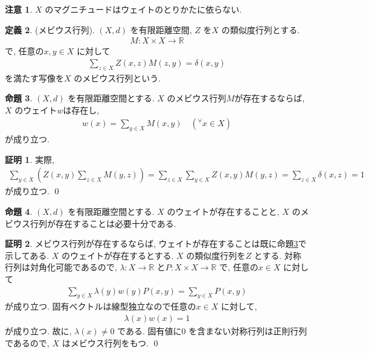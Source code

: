 \documentclass[10pt, fleqn, label-section=none]{bxjsarticle}
\theoremstyle{definition}
\newtheorem{dfn}{定義}[section]
\newtheorem{prop}[dfn]{命題}
\newtheorem*{pf*}{証明}
\newtheorem{remark}[dfn]{注意}
\newcommand{\any}{{}^{\forall}}
\renewcommand{\;}{\, ; \,}
\begin{document}
\begin{remark}$X$ のマグニチュードはウェイトのとりかたに依らない. 

\end{remark}



\begin{dfn}(メビウス行列). $(X, d)$ を有限距離空間, $Z$ を$X$ の類似度行列とする. 
\begin{align*} M: X \times X \rightarrow \mathbb R\end{align*} 
で, 任意の$x,y \in X$ に対して
\begin{align*} \sum_{z \in X} Z(x, z) M(z, y) = \delta (x,y) \end{align*}
を満たす写像を$X$ のメビウス行列という. 
\end{dfn}

\begin{prop}\label{1703}$(X, d)$ を有限距離空間とする. $X$ のメビウス行列$M$が存在するならば, $X$ のウェイト$w$は存在し, 
\begin{align*} w(x) = \sum_{y \in X} M(x, y) \quad (\any x \in X)\end{align*}
が成り立つ. 
\end{prop}
\begin{pf*}
実際, 
\begin{align*} \sum_{y \in X} (Z(x,y) \sum_{z \in X} M(y, z) )= \sum_{z \in X} \sum_{y \in X} Z(x, y)M(y, z) = \sum_{z \in X} \delta(x, z) = 1   \end{align*}
が成り立つ. 
\qed
\end{pf*}

\begin{prop}$(X, d)$ を有限距離空間とする. $X$ のウェイトが存在することと, $X$ のメビウス行列が存在することは必要十分である. 
\end{prop}
\begin{pf*}メビウス行列が存在するならば, ウェイトが存在することは既に命題\ref{1703}で示してある. $X$ のウェイトが存在するとする. $X$ の類似度行列を$Z$ とする. 対称行列は対角化可能であるので, 
$\lambda : X \rightarrow \mathbb R$ と$ P: X \times X \rightarrow \mathbb R$
で, 任意の$x \in X$ に対して
\begin{align*} \sum_{y \in X} \lambda (y) w(y) P(x, y) = \sum_{y \in X} P(x, y) \end{align*}
が成り立つ. 固有ベクトルは線型独立なので任意の$x \in X$ に対して, 
\begin{align*} \lambda(x) w(x) = 1\end{align*}
が成り立つ. 故に, $\lambda (x) \neq 0$ である. 固有値に$0$ を含まない対称行列は正則行列であるので, $X$ はメビウス行列をもつ. 
\qed
\end{pf*}
\end{document}

